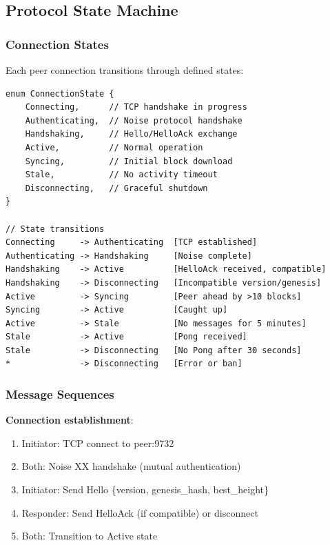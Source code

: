 \subsection{Protocol State Machine}

\subsubsection{Connection States}

Each peer connection transitions through defined states:

\begin{lstlisting}[caption={Connection state machine}]
enum ConnectionState {
    Connecting,      // TCP handshake in progress
    Authenticating,  // Noise protocol handshake
    Handshaking,     // Hello/HelloAck exchange
    Active,          // Normal operation
    Syncing,         // Initial block download
    Stale,           // No activity timeout
    Disconnecting,   // Graceful shutdown
}

// State transitions
Connecting     -> Authenticating  [TCP established]
Authenticating -> Handshaking     [Noise complete]
Handshaking    -> Active          [HelloAck received, compatible]
Handshaking    -> Disconnecting   [Incompatible version/genesis]
Active         -> Syncing         [Peer ahead by >10 blocks]
Syncing        -> Active          [Caught up]
Active         -> Stale           [No messages for 5 minutes]
Stale          -> Active          [Pong received]
Stale          -> Disconnecting   [No Pong after 30 seconds]
*              -> Disconnecting   [Error or ban]
\end{lstlisting}

\subsubsection{Message Sequences}

\textbf{Connection establishment}:
\begin{enumerate}
  \item Initiator: TCP connect to peer:9732
  \item Both: Noise XX handshake (mutual authentication)
  \item Initiator: Send Hello \{version, genesis\_hash, best\_height\}
  \item Responder: Send HelloAck (if compatible) or disconnect
  \item Both: Transition to Active state
\end{enumerate}


